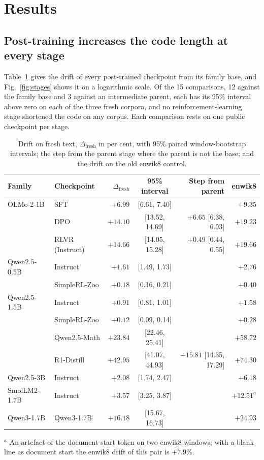 \documentclass[11pt,a4paper]{article}
\theoremstyle{definition}
\newcommand{\dfresh}{\Delta_{\mathrm{fresh}}}
\begin{document}
\section{Results}
\label{sec:results}

\subsection{Post-training increases the code length at every stage}
\label{sec:stages}

Table~\ref{tab:stages} gives the drift of every post-trained checkpoint from its family base, and
Fig.~\ref{fig:stages} shows it on a logarithmic scale. Of the 15 comparisons, 12 against the family base and 3
against an intermediate parent, each has its 95\% interval above zero on each of the three fresh corpora, and no
reinforcement-learning stage shortened the code on any corpus. Each comparison rests on one public checkpoint per
stage.

\begin{table}[ht]
\centering\small
\caption{Drift on fresh text, $\dfresh$ in per cent, with 95\% paired window-bootstrap intervals; the step from
the parent stage where the parent is not the base; and the drift on the old enwik8 control.}
\label{tab:stages}
\begin{tabular}{@{}l l r c r r@{}}
\toprule
Family & Checkpoint & $\dfresh$ & 95\% interval & Step from parent & enwik8 \\
\midrule
OLMo-2-1B & SFT & $+6.99$ & [6.61, 7.40] & & $+9.35$ \\
 & DPO & $+14.10$ & [13.52, 14.69] & $+6.65$ [6.38, 6.93] & $+19.23$ \\
 & RLVR (Instruct) & $+14.66$ & [14.05, 15.28] & $+0.49$ [0.44, 0.55] & $+19.66$ \\
Qwen2.5-0.5B & Instruct & $+1.61$ & [1.49, 1.73] & & $+2.76$ \\
 & SimpleRL-Zoo & $+0.18$ & [0.16, 0.21] & & $+0.40$ \\
Qwen2.5-1.5B & Instruct & $+0.91$ & [0.81, 1.01] & & $+1.58$ \\
 & SimpleRL-Zoo & $+0.12$ & [0.09, 0.14] & & $+0.28$ \\
 & Qwen2.5-Math & $+23.84$ & [22.46, 25.41] & & $+58.72$ \\
 & R1-Distill & $+42.95$ & [41.07, 44.93] & $+15.81$ [14.35, 17.29] & $+74.30$ \\
Qwen2.5-3B & Instruct & $+2.08$ & [1.74, 2.47] & & $+6.18$ \\
SmolLM2-1.7B & Instruct & $+3.57$ & [3.25, 3.87] & & $+12.51^{a}$ \\
Qwen3-1.7B & Qwen3-1.7B & $+16.18$ & [15.67, 16.73] & & $+24.93$ \\
\bottomrule
\end{tabular}

\smallskip
\parbox{\textwidth}{\footnotesize $^{a}$ An artefact of the document-start token on two enwik8 windows; with a
blank line as document start the enwik8 drift of this pair is $+7.9\%$.}
\end{table}
\end{document}
